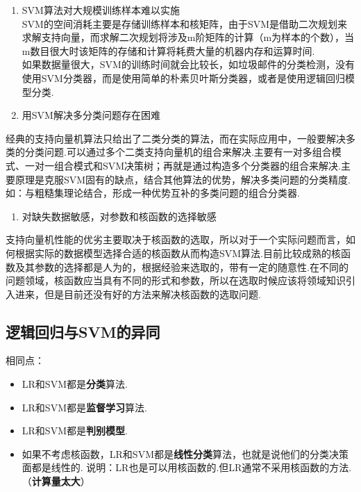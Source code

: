 \begin{enumerate}
\def\labelenumi{(\arabic{enumi})}
\item
  SVM算法对大规模训练样本难以实施\\
  ​
  SVM的空间消耗主要是存储训练样本和核矩阵，由于SVM是借助二次规划来求解支持向量，而求解二次规划将涉及m阶矩阵的计算（m为样本的个数），当m数目很大时该矩阵的存储和计算将耗费大量的机器内存和运算时间.\\
  ​
  如果数据量很大，SVM的训练时间就会比较长，如垃圾邮件的分类检测，没有使用SVM分类器，而是使用简单的朴素贝叶斯分类器，或者是使用逻辑回归模型分类.
\item
  用SVM解决多分类问题存在困难
\end{enumerate}

​
经典的支持向量机算法只给出了二类分类的算法，而在实际应用中，一般要解决多类的分类问题.可以通过多个二类支持向量机的组合来解决.主要有一对多组合模式、一对一组合模式和SVM决策树；再就是通过构造多个分类器的组合来解决.主要原理是克服SVM固有的缺点，结合其他算法的优势，解决多类问题的分类精度.如：与粗糙集理论结合，形成一种优势互补的多类问题的组合分类器.

\begin{enumerate}
\def\labelenumi{(\arabic{enumi})}
\setcounter{enumi}{2}
\item
  对缺失数据敏感，对参数和核函数的选择敏感
\end{enumerate}

​
支持向量机性能的优劣主要取决于核函数的选取，所以对于一个实际问题而言，如何根据实际的数据模型选择合适的核函数从而构造SVM算法.目前比较成熟的核函数及其参数的选择都是人为的，根据经验来选取的，带有一定的随意性.在不同的问题领域，核函数应当具有不同的形式和参数，所以在选取时候应该将领域知识引入进来，但是目前还没有好的方法来解决核函数的选取问题.

\subsection{逻辑回归与SVM的异同}\label{ux903bux8f91ux56deux5f52ux4e0esvmux7684ux5f02ux540c}

相同点：

\begin{itemize}
\item
  LR和SVM都是\textbf{分类}算法.
\item
  LR和SVM都是\textbf{监督学习}算法.
\item
  LR和SVM都是\textbf{判别模型}.
\item
  如果不考虑核函数，LR和SVM都是\textbf{线性分类}算法，也就是说他们的分类决策面都是线性的.
  说明：LR也是可以用核函数的.但LR通常不采用核函数的方法.（\textbf{计算量太大}）
\end{itemize}


